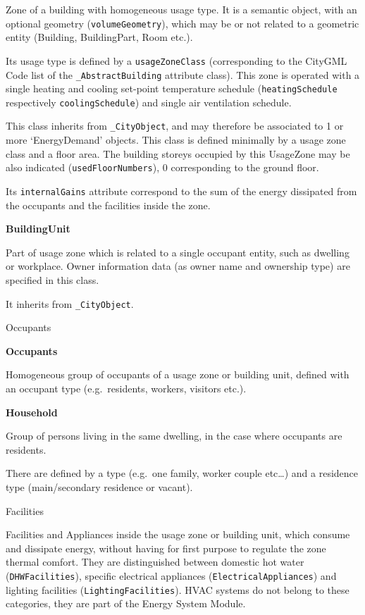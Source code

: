 \documentclass[a4paper,12pt]{article}
\begin{document}
Zone of a building with homogeneous usage type. It is a semantic object,
with an optional geometry (\texttt{volumeGeometry}), which may be or not
related to a geometric entity (Building, BuildingPart, Room etc.).

Its usage type is defined by a \texttt{usageZoneClass} (corresponding to
the CityGML Code list of the \texttt{\_AbstractBuilding} attribute
class). This zone is operated with a single heating and cooling
set-point temperature schedule (\texttt{heatingSchedule} respectively
\texttt{coolingSchedule}) and single air ventilation schedule.

This class inherits from \texttt{\_CityObject}, and may therefore be
associated to 1 or more `EnergyDemand' objects. This class is defined
minimally by a usage zone class and a floor area. The building storeys
occupied by this UsageZone may be also indicated
(\texttt{usedFloorNumbers}), 0 corresponding to the ground floor.

Its \texttt{internalGains} attribute correspond to the sum of the energy
dissipated from the occupants and the facilities inside the zone.

\textbf{BuildingUnit}

Part of usage zone which is related to a single occupant entity, such as
dwelling or workplace. Owner information data (as owner name and
ownership type) are specified in this class.

It inherits from \texttt{\_CityObject}.

Occupants

\textbf{Occupants}

Homogeneous group of occupants of a usage zone or building unit, defined
with an occupant type (e.g.~residents, workers, visitors etc.).

\textbf{Household}

Group of persons living in the same dwelling, in the case where
occupants are residents.

There are defined by a type (e.g.~one family, worker couple etc\ldots{})
and a residence type (main/secondary residence or vacant).

Facilities

Facilities and Appliances inside the usage zone or building unit, which
consume and dissipate energy, without having for first purpose to
regulate the zone thermal comfort. They are distinguished between
domestic hot water (\texttt{DHWFacilities}), specific electrical
appliances (\texttt{ElectricalAppliances}) and lighting facilities
(\texttt{LightingFacilities}). HVAC systems do not belong to these
categories, they are part of the Energy System Module.
\end{document}
